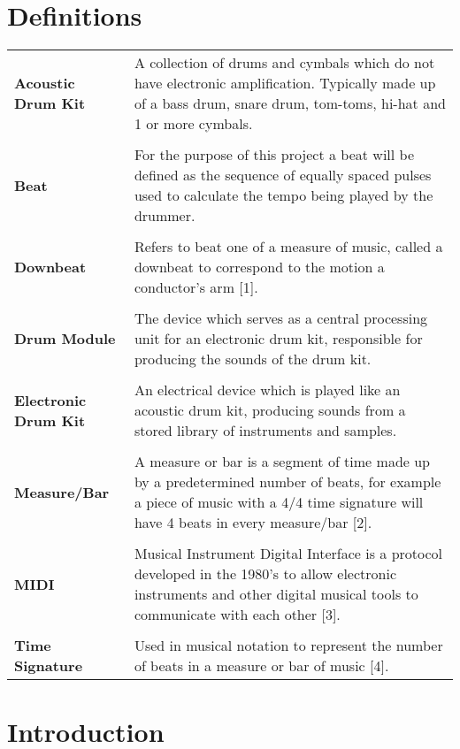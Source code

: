 \documentclass[a4paper, 11pt]{article}
\begin{document}
\section*{Definitions}
\begin{tabular}{l p{4.5in}  }\\
\textbf{Acoustic Drum Kit} & A collection of drums and cymbals which do not have electronic amplification. Typically made up of a bass drum, snare drum, tom-toms, hi-hat and 1 or more cymbals.\\\\
\textbf{Beat} & For the purpose of this project a beat will be defined as the sequence of equally spaced pulses used to calculate the tempo being played by the drummer.\\\\
\textbf{Downbeat} & Refers to beat one of a measure of music, called a downbeat to correspond to the motion a conductor's arm [1].\\\\
\textbf{Drum Module} & The device which serves as a central processing unit for an electronic drum kit, responsible for producing the sounds of the drum kit.\\\\
\textbf{Electronic Drum Kit} & An electrical device which is played like an acoustic drum kit, producing sounds from a stored library of instruments and samples.\\\\
\textbf{Measure/Bar} & A measure or bar is a segment of time made up by a predetermined number of beats, for example a piece of music with a 4/4 time signature will have 4 beats in every measure/bar [2].\\\\
\textbf{MIDI} & Musical Instrument Digital Interface is a protocol developed in the 1980's to allow electronic instruments and other digital musical tools to communicate with each other [3].\\\\
\textbf{Time Signature} & Used in musical notation to represent the number of beats in a measure or bar of music [4].
\end{tabular}
\clearpage

\maketitle{} \section{Introduction}
\end{document}
